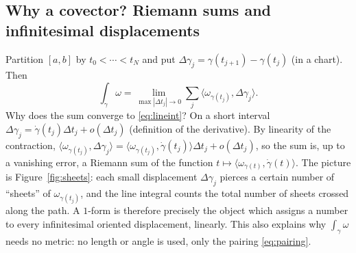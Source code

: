 \subsection{Why a covector? Riemann sums and infinitesimal displacements}\label{sec:riemannsums}

Partition $[a,b]$ by $t_0<\cdots<t_N$ and put $\Delta\gamma_j=\gamma(t_{j+1})-\gamma(t_j)$ (in a chart). Then
\[
\int_\gamma\omega=\lim_{\max|\Delta t_j|\to0}\sum_j\bigl\langle\omega_{\gamma(t_j)},\Delta\gamma_j\bigr\rangle .
\]
Why does the sum converge to \eqref{eq:lineint}? On a short interval $\Delta\gamma_j=\dot\gamma(t_j)\Delta t_j+o(\Delta t_j)$ (definition of the derivative). By linearity of the contraction,
$\langle\omega_{\gamma(t_j)},\Delta\gamma_j\rangle=\langle\omega_{\gamma(t_j)},\dot\gamma(t_j)\rangle\Delta t_j+o(\Delta t_j)$, so the sum is, up to a vanishing error, a Riemann sum of the function $t\mapsto\langle\omega_{\gamma(t)},\dot\gamma(t)\rangle$.
The picture is Figure~\ref{fig:sheets}: each small displacement $\Delta\gamma_j$ pierces a certain number of ``sheets'' of $\omega_{\gamma(t_j)}$, and the line integral counts the total number of sheets crossed along the path. A $1$-form is therefore precisely the object which assigns a number to every infinitesimal oriented displacement, linearly. This also explains why $\int_\gamma\omega$ needs no metric: no length or angle is used, only the pairing \eqref{eq:pairing}.

